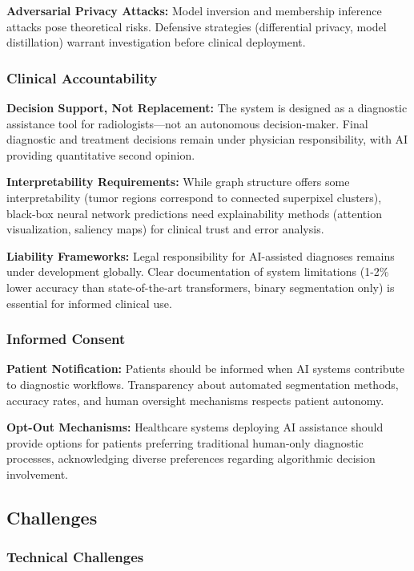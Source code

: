 \textbf{Adversarial Privacy Attacks:} Model inversion and membership inference attacks pose theoretical risks. Defensive strategies (differential privacy, model distillation) warrant investigation before clinical deployment.

\subsubsection{Clinical Accountability}

\textbf{Decision Support, Not Replacement:} The system is designed as a diagnostic assistance tool for radiologists—not an autonomous decision-maker. Final diagnostic and treatment decisions remain under physician responsibility, with AI providing quantitative second opinion.

\textbf{Interpretability Requirements:} While graph structure offers some interpretability (tumor regions correspond to connected superpixel clusters), black-box neural network predictions need explainability methods (attention visualization, saliency maps) for clinical trust and error analysis.

\textbf{Liability Frameworks:} Legal responsibility for AI-assisted diagnoses remains under development globally. Clear documentation of system limitations (1-2\% lower accuracy than state-of-the-art transformers, binary segmentation only) is essential for informed clinical use.

\subsubsection{Informed Consent}

\textbf{Patient Notification:} Patients should be informed when AI systems contribute to diagnostic workflows. Transparency about automated segmentation methods, accuracy rates, and human oversight mechanisms respects patient autonomy.

\textbf{Opt-Out Mechanisms:} Healthcare systems deploying AI assistance should provide options for patients preferring traditional human-only diagnostic processes, acknowledging diverse preferences regarding algorithmic decision involvement.


\subsection{Challenges}

\subsubsection{Technical Challenges}

